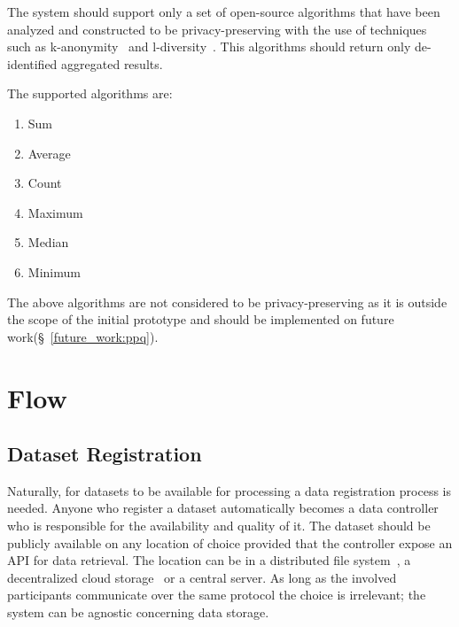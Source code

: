 The system should support only a set of open-source algorithms that have been analyzed and constructed to be privacy-preserving with the use of techniques such as k-anonymity~\cite{Samarati98protectingprivacy} and l-diversity~\cite{Aggarwal2008}. This algorithms should return only de-identified aggregated results.

The supported algorithms are:

\begin{enumerate}
  \item Sum
  \item Average
  \item Count
  \item Maximum
  \item Median
  \item Minimum
\end{enumerate}

The above algorithms are not considered to be privacy-preserving as it is outside the scope of the initial prototype and should be implemented on future work(§~\ref{future_work:ppq}).

\section{Flow}
\label{solution:flow}

\subsection{Dataset Registration}
\label{solution:flow:reg_data}

Naturally, for datasets to be available for processing a data registration process is needed. Anyone who register a dataset automatically becomes a data controller who is responsible for the availability and quality of it. The dataset should be publicly available on any location of choice provided that the controller expose an API for data retrieval. The location can be in a distributed file system~\cite{ipfs}, a decentralized cloud storage~\cite{storj} or a central server. As long as the involved participants communicate over the same protocol the choice is irrelevant; the system can be agnostic concerning data storage.

